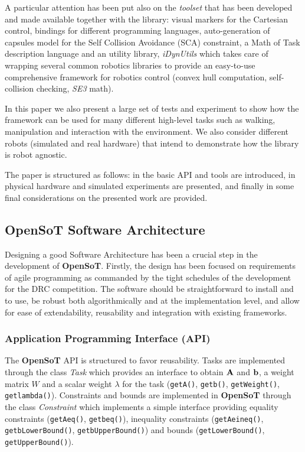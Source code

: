 A particular attention has been put also on the \emph{toolset} that has been developed and made available together with the library: visual markers for the Cartesian control, bindings for different programming languages, auto-generation of capsules model for the Self Collision Avoidance (SCA) constraint, a Math of Task description language and an utility library, \emph{iDynUtils} which takes care of wrapping several common robotics libraries to provide an easy-to-use comprehensive framework for robotics control (convex hull computation, self-collision checking, \emph{SE3} math). 

In this paper we also present a large set of tests and experiment to show how the framework can be used for many different high-level tasks such as walking, manipulation and interaction with the environment. We also consider different robots (simulated and real hardware) that intend to demonstrate how the library is robot agnostic.

The paper is structured as follows: in \textbf{} the basic API and tools are introduced, in \textbf{}physical hardware and simulated  experiments are presented, and finally in \textbf{} some final considerations on the presented work are provided.

\subsection{OpenSoT Software Architecture}
\label{sec:software_architecture}
Designing a good Software Architecture has been a crucial step in the development of \textbf{OpenSoT}. Firstly, the design has been focused on requirements of agile programming as commanded by the tight schedules of the development for the DRC competition. The software should be straightforward to install and to use, be robust both algorithmically and at the implementation level, and allow for ease of extendability, reusability and integration with existing frameworks.

\subsubsection{Application Programming Interface (API)}
The \textbf{OpenSoT} API is structured to favor reusability.
Tasks are implemented through the class \emph{Task} which provides an interface to obtain $\mathbf{A}$ and $\mathbf{b}$, a weight matrix $W$ and a scalar weight $\lambda$ for the task (\texttt{\small getA()}, \texttt{\small getb()}, \texttt{\small getWeight()}, \texttt{\small getlambda()}).
Constraints and bounds are implemented in \textbf{OpenSoT} through the class \emph{Constraint} which implements a simple interface providing equality constraints (\texttt{\small getAeq()}, \texttt{\small getbeq()}), inequality constraints (\texttt{\small getAeineq()}, \texttt{\small getbLowerBound()}, \texttt{\small getbUpperBound()}) and bounds (\texttt{\small getLowerBound()}, \texttt{\small getUpperBound()}).

